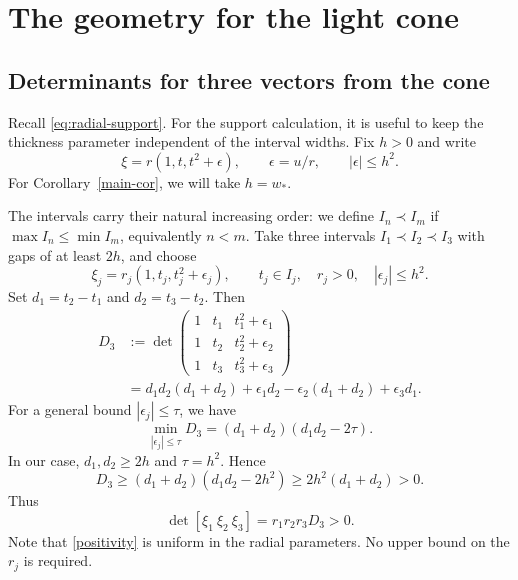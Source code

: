 \documentclass{amsart}
\numberwithin{equation}{section}
\newcommand{\e}{\epsilon}
\begin{document}
\bigskip 

\section{The geometry for the light cone}
\label{sec:geometry}

\subsection{Determinants for three vectors from the cone}

Recall \eqref{eq:radial-support}. 
For the support calculation, it is useful to keep the thickness parameter independent of the interval
widths. 
Fix $h>0$ and write
\[
    \xi=r(1,t,t^2+\e),\qquad
    \e=u/r,\qquad |\e|\leq h^2.
\]
For Corollary~\ref{main-cor}, we will take $h=w_*$.

The intervals carry their natural increasing order: we define $I_n\prec I_m$ if $\max I_n\leq\min I_m$, equivalently $n<m$.
Take three intervals $I_1\prec I_2\prec I_3$ with gaps of at least $2h$, and choose
\[
    \xi_j=r_j(1,t_j,t_j^2+\e_j),\qquad
    t_j\in I_j,\quad r_j>0,\quad |\e_j|\leq h^2.
\]
Set $d_1=t_2-t_1$ and $d_2=t_3-t_2$. Then
\begin{equation}
\label{eq:determinant}
\begin{aligned}
    D_3&:=\det\begin{pmatrix}
       1&t_1&t_1^2+\e_1\\
       1&t_2&t_2^2+\e_2\\
       1&t_3&t_3^2+\e_3
       \end{pmatrix}\\
    &=d_1d_2(d_1+d_2)+\e_1d_2-\e_2(d_1+d_2)+\e_3d_1.
\end{aligned}
\end{equation}
For a general bound $|\e_j|\leq\tau$, we have
\begin{equation}
\label{eq:minimum-determinant}
    \min_{|\e_j|\leq\tau}D_3=(d_1+d_2)(d_1d_2-2\tau).
\end{equation}
In our case, $d_1,d_2\geq2h$ and $\tau=h^2$. Hence
\[
    D_3\geq(d_1+d_2)(d_1d_2-2h^2)
    \geq2h^2(d_1+d_2)>0.
\]
Thus
\begin{equation}
\label{positivity}
    \det[\xi_1\ \xi_2\ \xi_3]=r_1r_2r_3D_3>0.
\end{equation}
Note that \eqref{positivity} is uniform in the radial parameters. 
No upper bound on the $r_j$ is required.

\medskip 
\end{document}
